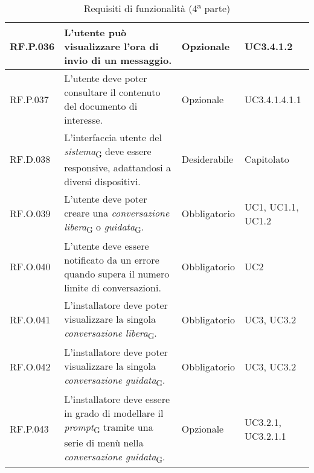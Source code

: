 \begin{table}[H]
\begin{tabular}{|C{2.7cm}|L{6.5cm}|C{2.7cm}|C{2.7cm}|}
        \hline
        RF.P.036 & L’utente può visualizzare l'ora di invio di un messaggio.
         & Opzionale & UC3.4.1.2 \\
        \hline
        RF.P.037 & L’utente deve poter consultare il contenuto del documento di interesse.
         & Opzionale & UC3.4.1.4.1.1 \\
        \hline
        RF.D.038 & L'interfaccia utente del \textit{sistema}\textsubscript{G} deve essere responsive, adattandosi a diversi dispositivi. & Desiderabile & Capitolato \\
        \hline
        RF.O.039 & L'utente deve poter creare una \textit{conversazione libera}\textsubscript{G} o \textit{guidata}\textsubscript{G}. & Obbligatorio & UC1, UC1.1, UC1.2 \\ \hline
        RF.O.040 & L'utente deve essere notificato da un errore quando supera il numero limite di conversazioni. & Obbligatorio & UC2 \\ \hline
        RF.O.041 & L'installatore deve poter visualizzare la singola \textit{conversazione libera}\textsubscript{G}. & Obbligatorio & UC3, UC3.2 \\ \hline 
        RF.O.042 & L'installatore deve poter visualizzare la singola \textit{conversazione guidata}\textsubscript{G}. & Obbligatorio & UC3, UC3.2 \\ \hline
        RF.P.043 & L'installatore deve essere in grado di modellare il \textit{prompt}\textsubscript{G} tramite una serie di menù nella \textit{conversazione guidata}\textsubscript{G}. & Opzionale & UC3.2.1, UC3.2.1.1 \\
        \hline
    \end{tabular}
    \caption{Requisiti di funzionalità (4\textsuperscript{a}  parte)}
\end{table}
